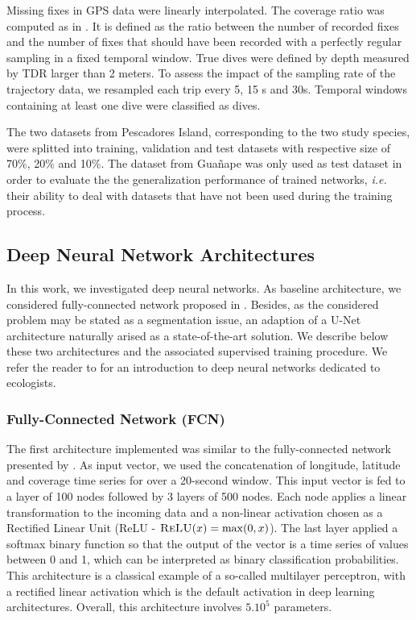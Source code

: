 \documentclass{article}
\begin{document}
Missing fixes in GPS data were linearly interpolated.
The coverage ratio was computed as in \cite{browning_predicting_2018}.
It is defined as the ratio between the number of recorded fixes and the number of fixes that should have been recorded with a perfectly regular sampling in a fixed temporal window.
True dives were defined by depth measured by TDR larger than 2 meters. To assess the impact of the sampling rate of the trajectory data, we resampled each trip every 5, 15 s and 30s. Temporal windows containing at least one dive were classified as dives.

The two datasets from Pescadores Island, corresponding to the two study species,  were splitted into training, validation and test datasets with respective size of 70\%, 20\% and 10\%. The dataset from Guañape was only used as test dataset in order to evaluate the the generalization performance of trained networks, {\em i.e.} their ability to deal with datasets that have not been used during the training process.

\subsection{Deep Neural Network Architectures}

In this work, we investigated deep neural networks. As baseline architecture, we considered fully-connected network proposed in \cite{browning_predicting_2018}. Besides, as the considered problem may be stated as a segmentation issue, an adaption of a U-Net architecture naturally arised as a state-of-the-art solution. We describe below these two architectures and the associated supervised training procedure. We refer the reader to \cite{christin_applications_2019} for an introduction to deep neural networks dedicated to ecologists.

\subsubsection{Fully-Connected Network (FCN)}
The first architecture implemented was similar to the fully-connected network presented by \cite{browning_predicting_2018}. As input vector, we used the concatenation of longitude, latitude and coverage time series for over a 20-second window. This input vector is fed to a layer of 100 nodes followed by 3 layers of 500 nodes. Each node applies a linear transformation to the incoming data and a non-linear activation chosen as a Rectified Linear Unit (ReLU - $\textsc{ReLU}(x) = \max(0,x)$). The last layer applied a softmax binary function so that the output of the vector is a time series of values between  0 and 1, which can be interpreted as binary classification probabilities.
This  architecture is a classical example of a so-called multilayer perceptron, with a rectified linear activation which is the default activation in deep learning architectures. Overall, this architecture involves $5.10^{5}$ parameters.
\end{document}

